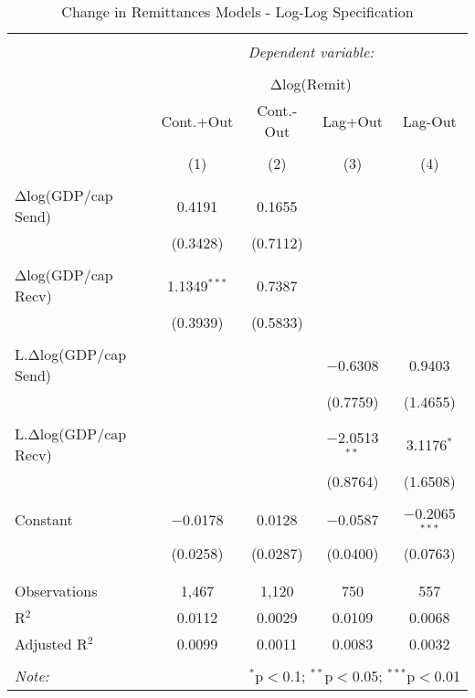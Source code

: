 
\begin{table}[!htbp] \centering 
  \caption{Change in Remittances Models - Log-Log Specification} 
  \label{} 
\begin{tabular}{@{\extracolsep{5pt}}lcccc} 
\\[-1.8ex]\hline 
\hline \\[-1.8ex] 
 & \multicolumn{4}{c}{\textit{Dependent variable:}} \\ 
\cline{2-5} 
\\[-1.8ex] & \multicolumn{4}{c}{Δlog(Remit)} \\ 
 & Cont.+Out & Cont.-Out & Lag+Out & Lag-Out \\ 
\\[-1.8ex] & (1) & (2) & (3) & (4)\\ 
\hline \\[-1.8ex] 
 Δlog(GDP/cap Send) & 0.4191 & 0.1655 &  &  \\ 
  & (0.3428) & (0.7112) &  &  \\ 
  & & & & \\ 
 Δlog(GDP/cap Recv) & 1.1349$^{***}$ & 0.7387 &  &  \\ 
  & (0.3939) & (0.5833) &  &  \\ 
  & & & & \\ 
 L.Δlog(GDP/cap Send) &  &  & $-$0.6308 & 0.9403 \\ 
  &  &  & (0.7759) & (1.4655) \\ 
  & & & & \\ 
 L.Δlog(GDP/cap Recv) &  &  & $-$2.0513$^{**}$ & 3.1176$^{*}$ \\ 
  &  &  & (0.8764) & (1.6508) \\ 
  & & & & \\ 
 Constant & $-$0.0178 & 0.0128 & $-$0.0587 & $-$0.2065$^{***}$ \\ 
  & (0.0258) & (0.0287) & (0.0400) & (0.0763) \\ 
  & & & & \\ 
\hline \\[-1.8ex] 
Observations & 1,467 & 1,120 & 750 & 557 \\ 
R$^{2}$ & 0.0112 & 0.0029 & 0.0109 & 0.0068 \\ 
Adjusted R$^{2}$ & 0.0099 & 0.0011 & 0.0083 & 0.0032 \\ 
\hline 
\hline \\[-1.8ex] 
\textit{Note:}  & \multicolumn{4}{r}{$^{*}$p$<$0.1; $^{**}$p$<$0.05; $^{***}$p$<$0.01} \\ 
\end{tabular} 
\end{table} 
